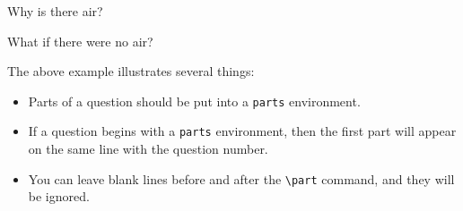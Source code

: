 \documentclass[12pt]{exam}
\begin{document}
\begin{questions}
\question
Why is there air?

\question
What if there were no air?


\question



\end{questions}

\bigskip

The above example illustrates several things:
%
\begin{itemize}
\item
Parts of a question should be put into a \verb"parts" environment.

\item
If a question begins with a \verb"parts" environment, then the first
part will appear on the same line with the question number.

\item
You can leave blank lines before and after the \verb"\part" command,
and they will be ignored.
\end{itemize}


\bigskip
\end{document}

